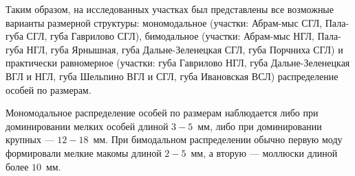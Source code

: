 \bigskip

Таким образом, на исследованных участках был представлены все возможные варианты размерной структуры: мономодальное (участки: Абрам-мыс СГЛ, Пала-губа СГЛ, губа Гаврилово СГЛ), бимодальное (участки: Абрам-мыс НГЛ, Пала-губа НГЛ, губа Ярнышная, губа Дальне-Зеленецкая СГЛ, губа Порчниха СГЛ) и практически равномерное (участки: губа Гаврилово НГЛ, губа Дальне-Зеленецкая ВГЛ и НГЛ, губа Шельпино ВГЛ и СГЛ, губа Ивановская ВСЛ) распределение особей по размерам. 

Мономодальное распределение особей по размерам наблюдается либо при доминировании мелких особей длиной $3-5$~мм, либо при доминировании крупных --- $12-18$~мм.
При бимодальном распределении обычно первую моду формировали мелкие макомы длиной $2-5$~мм, а вторую --- моллюски длиной более $10$~мм.

\afterpage{\clearpage}
